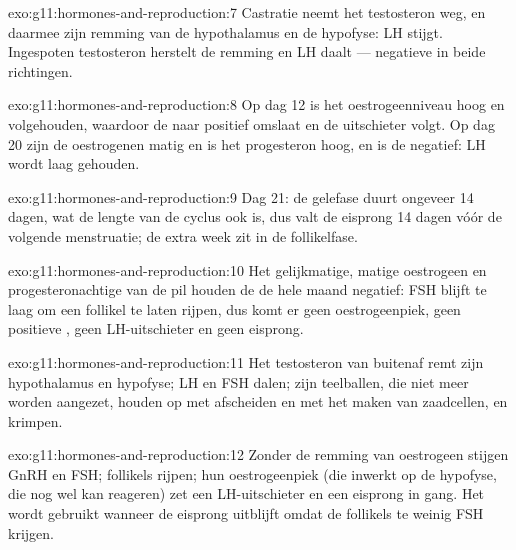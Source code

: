 \begin{solution}{exo:g11:hormones-and-reproduction:7}
Castratie neemt het testosteron weg, en daarmee zijn remming van de
hypothalamus en de hypofyse: LH stijgt. Ingespoten testosteron herstelt
de remming en LH daalt --- negatieve  in beide richtingen.
\end{solution}

\begin{solution}{exo:g11:hormones-and-reproduction:8}
Op dag 12 is het oestrogeenniveau hoog en volgehouden, waardoor de
 naar positief omslaat en de uitschieter volgt. Op dag 20
zijn de oestrogenen matig en is het progesteron hoog, en is de
 negatief: LH wordt laag gehouden.
\end{solution}

\begin{solution}{exo:g11:hormones-and-reproduction:9}
Dag 21: de gelefase duurt ongeveer 14 dagen, wat de lengte van de cyclus
ook is, dus valt de eisprong 14 dagen vóór de volgende menstruatie; de
extra week zit in de follikelfase.
\end{solution}

\begin{solution}{exo:g11:hormones-and-reproduction:10}
Het gelijkmatige, matige oestrogeen en progesteronachtige  van de
pil houden de  de hele maand negatief: FSH blijft te laag
om een follikel te laten rijpen, dus komt er geen oestrogeenpiek, geen
positieve , geen LH-uitschieter en geen eisprong.
\end{solution}

\begin{solution}{exo:g11:hormones-and-reproduction:11}
Het testosteron van buitenaf remt zijn hypothalamus en hypofyse; LH en
FSH dalen; zijn teelballen, die niet meer worden aangezet, houden op met
afscheiden en met het maken van zaadcellen, en krimpen.
\end{solution}

\begin{solution}{exo:g11:hormones-and-reproduction:12}
Zonder de remming van oestrogeen stijgen GnRH en FSH; follikels rijpen;
hun oestrogeenpiek (die inwerkt op de hypofyse, die nog wel kan reageren)
zet een LH-uitschieter en een eisprong in gang. Het wordt gebruikt wanneer
de eisprong uitblijft omdat de follikels te weinig FSH krijgen.
\end{solution}

